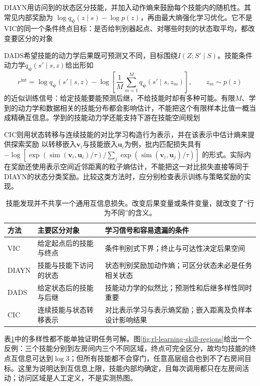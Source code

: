 DIAYN用访问到的状态区分技能，并加入动作熵来鼓励每个技能内的随机性。其常见内部奖励为
$\log q_{\bm\psi}(z\mid s)-\log p(z)$，再由最大熵强化学习优化。它不是VIC的同一个条件终点目标：是否给判别器起点、对哪些时刻的状态取平均，都改变要区分的对象

DADS希望技能的动力学后果既可预测又不同，目标围绕$I(Z;S'\mid S)$。技能条件动力学$q_{\bm\psi}(s'\mid s,z)$给出形如
\[
 r^{\mathrm{int}}
   =\log q_{\bm\psi}(s'\mid s,z)
    -\log\left[\frac{1}{M}\sum_{m=1}^{M}
                      q_{\bm\psi}(s'\mid s,z_m)\right],
       \qquad z_m\sim p(z)
\]
的近似训练信号：给定技能要能预测后继，不给技能时却有多种可能。有限$M$、学到的动力学和数据相关的技能分布都会影响估计，不能把这个有限样本比值一概当成精确互信息。学到的技能动力学还能支持下游在技能空间规划

CIC则用状态转移与连续技能的对比学习构造行为表示，并在该表示中估计熵来提供探索奖励
以转移嵌入$\bm v_i$与技能嵌入$\bm u_i$为例，批内匹配损失具有
$-\log[\exp(\operatorname{sim}(\bm v_i,\bm u_i)/\tau)/
\sum_j\exp(\operatorname{sim}(\bm v_i,\bm u_j)/\tau)]$
的形式。实际内在奖励还使用表示空间近邻距离的粒子熵估计，不能把这一对比损失直接等同于DIAYN的状态分类奖励。比较这类方法时，应分别检查表示训练与策略奖励的实现。

\begin{table}[t]
  \centering
  \small
  \begin{tabularx}{\linewidth}{>{\raggedright\arraybackslash}p{19mm} >{\raggedright\arraybackslash}X >{\raggedright\arraybackslash}X}
    \toprule
    方法 & 主要区分对象 & 学习信号和容易遗漏的条件 \\
    \midrule
    VIC & 给定起点后的技能与终点 & 条件判别式下界；终止与可达性决定后果空间 \\
    DIAYN & 技能与技能下访问的状态 & 状态判别奖励加动作熵；可区分状态未必是任务相关状态 \\
    DADS & 给定状态后的技能与后继 & 技能动力学的似然比；预测性和后继多样性同时重要 \\
    CIC & 连续技能与状态转移表示 & 对比表示学习与表示熵奖励；嵌入距离及负样本设计影响结果 \\
    \bottomrule
  \end{tabularx}
  \caption{技能发现并不共享一个通用互信息损失。改变后果变量或条件变量，就改变了“行为不同”的含义。}
  \label{tab:rl-learning-skill-objectives}
\end{table}

表\ref{tab:rl-learning-skill-objectives}中的多样性都不能单独证明任务可解。图\ref{fig:rl-learning-skill-regions}给出一个反例：三个技能分别到左房间内三个不同区域，终点可完全区分，故均匀技能的终点互信息可达到$\log3$；但所有技能都不会穿门，任意高层组合也到不了右房间目标。这里为说明达到互信息上限，技能内部均确定，且每次调用都只在左房间活动；访问区域是人工定义，不是实测热图。

